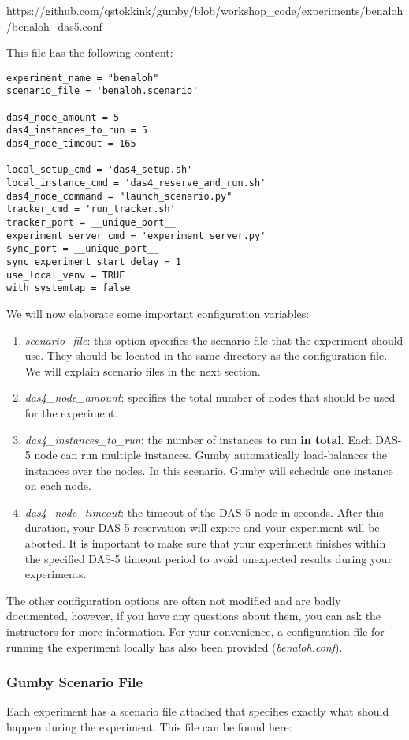 \documentclass{article}
\begin{document}
https://github.com/qstokkink/gumby/blob/workshop\_code/experiments/benaloh/benaloh\_das5.conf

This file has the following content:

\begin{lstlisting}[frame=single]
experiment_name = "benaloh"
scenario_file = 'benaloh.scenario'

das4_node_amount = 5
das4_instances_to_run = 5
das4_node_timeout = 165

local_setup_cmd = 'das4_setup.sh'
local_instance_cmd = 'das4_reserve_and_run.sh'
das4_node_command = "launch_scenario.py"
tracker_cmd = 'run_tracker.sh'
tracker_port = __unique_port__
experiment_server_cmd = 'experiment_server.py'
sync_port = __unique_port__
sync_experiment_start_delay = 1
use_local_venv = TRUE
with_systemtap = false
\end{lstlisting}

We will now elaborate some important configuration variables:
\begin{enumerate}
	\item \emph{scenario\_file}: this option specifies the scenario file that the experiment should use. They should be located in the same directory as the configuration file. We will explain scenario files in the next section.
	\item \emph{das4\_node\_amount}: specifies the total number of nodes that should be used for the experiment.
	\item \emph{das4\_instances\_to\_run}: the number of instances to run \textbf{in total}. Each DAS-5 node can run multiple instances. Gumby automatically load-balances the instances over the nodes. In this scenario, Gumby will schedule one instance on each node.
	\item \emph{das4\_node\_timeout}: the timeout of the DAS-5 node in seconds. After this duration, your DAS-5 reservation will expire and your experiment will be aborted. It is important to make sure that your experiment finishes within the specified DAS-5 timeout period to avoid unexpected results during your experiments.
\end{enumerate}

The other configuration options are often not modified and are badly documented, however, if you have any questions about them, you can ask the instructors for more information.
For your convenience, a configuration file for running the experiment locally has also been provided (\emph{benaloh.conf}).

\subsubsection{Gumby Scenario File}
Each experiment has a scenario file attached that specifies exactly what should happen during the experiment.
This file can be found here:
\end{document}
